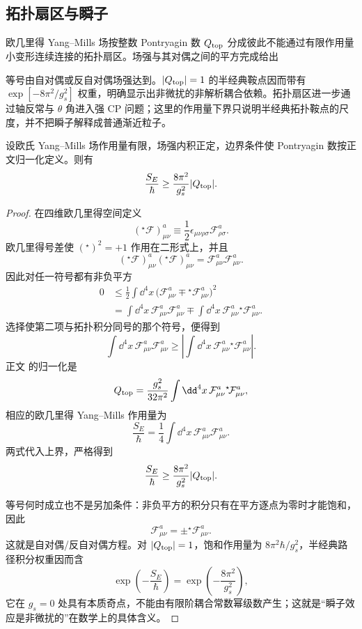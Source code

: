 \subsection{拓扑扇区与瞬子}

\begin{proposition}[拓扑作用量下界]
欧几里得 Yang--Mills 场按整数 Pontryagin 数 $Q_{\rm top}$ 分成彼此不能通过有限作用量小变形连续连接的拓扑扇区。场强与其对偶之间的平方完成给出

等号由自对偶或反自对偶场强达到。$|Q_{\rm top}|=1$ 的半经典鞍点因而带有 $\exp[-8\pi^2/g_s^2]$ 权重，明确显示出非微扰的非解析耦合依赖。拓扑扇区进一步通过轴反常与 $\theta$ 角进入强 CP 问题；这里的作用量下界只说明半经典拓扑鞍点的尺度，并不把瞬子解释成普通渐近粒子。
\end{proposition}

\begin{proposition}[欧氏场强的拓扑下界]
设欧氏 Yang--Mills 场作用量有限，场强内积正定，边界条件使 Pontryagin 数按正文归一化定义。则有
\begin{equation}
 {
 \frac{S_E}{\hbar}
 \ge\frac{8\pi^2}{g_s^2}|Q_{\rm top}|.}
\label{eq:instanton-action-bound-dp11}
\end{equation}
\end{proposition}
\begin{proof}
在四维欧几里得空间定义
\[
({}^\star\!\mathcal F)_{\mu\nu}^a
\equiv\frac12\epsilon_{\mu\nu\rho\sigma}
\mathcal F_{\rho\sigma}^a.
\]
欧几里得号差使 $({}^\star)^2=+1$ 作用在二形式上，并且
\[
({}^\star\!\mathcal F)_{\mu\nu}^a
({}^\star\!\mathcal F)_{\mu\nu}^a
=\mathcal F_{\mu\nu}^a\mathcal F_{\mu\nu}^a.
\]
因此对任一符号都有非负平方
\begin{align*}
0
&\le\frac12\int\dd^4x\,
\bigl(\mathcal F_{\mu\nu}^a
\mp{}^\star\!\mathcal F_{\mu\nu}^a\bigr)^2\\
&=\int\dd^4x\,
\mathcal F_{\mu\nu}^a\mathcal F_{\mu\nu}^a
\mp\int\dd^4x\,
\mathcal F_{\mu\nu}^a{}^\star\!\mathcal F_{\mu\nu}^a.
\end{align*}
选择使第二项与拓扑积分同号的那个符号，便得到
\[
\int\dd^4x\,
\mathcal F_{\mu\nu}^a\mathcal F_{\mu\nu}^a
\ge
\left|
\int\dd^4x\,
\mathcal F_{\mu\nu}^a{}^\star\!\mathcal F_{\mu\nu}^a
\right|.
\]
正文 的归一化是
\[
Q_{\rm top}
=\frac{g_s^2}{32\pi^2}
\int\dd^4x\,
\mathcal F_{\mu\nu}^a{}^\star\!\mathcal F_{\mu\nu}^a,
\]
相应的欧几里得 Yang--Mills 作用量为
\[
\frac{S_E}{\hbar}
=\frac14\int\dd^4x\,
\mathcal F_{\mu\nu}^a\mathcal F_{\mu\nu}^a.
\]
两式代入上界，严格得到
\[
{
\frac{S_E}{\hbar}
\ge\frac{8\pi^2}{g_s^2}|Q_{\rm top}|.}
\]

等号何时成立也不是另加条件：非负平方的积分只有在平方逐点为零时才能饱和，因此
\[
\mathcal F_{\mu\nu}^a
=\pm{}^\star\!\mathcal F_{\mu\nu}^a.
\]
这就是自对偶/反自对偶方程。对 $|Q_{\rm top}|=1$，饱和作用量为 $8\pi^2\hbar/g_s^2$，半经典路径积分权重因而含
\[
\exp\!\left(-\frac{S_E}{\hbar}\right)
=\exp\!\left(-\frac{8\pi^2}{g_s^2}\right),
\]
它在 $g_s=0$ 处具有本质奇点，不能由有限阶耦合常数幂级数产生；这就是“瞬子效应是非微扰的”在数学上的具体含义。
\end{proof}


